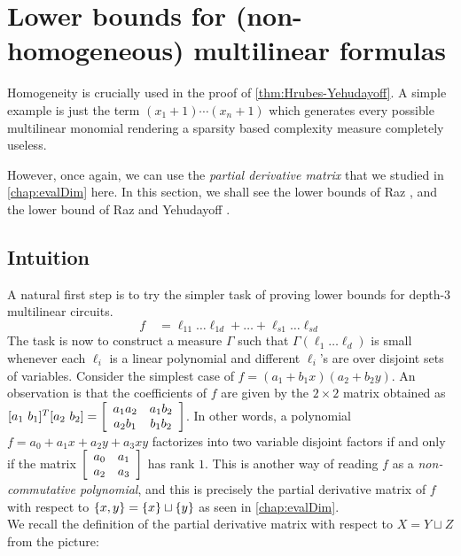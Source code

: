 \section{Lower bounds for (non-homogeneous)  multilinear formulas}

Homogeneity is crucially used in the proof of \autoref{thm:Hrubes-Yehudayoff}.
A simple example is just the term $(x_1 + 1) \cdots (x_n + 1)$ which generates every possible multilinear monomial rendering a sparsity based complexity measure completely useless.

However, once again, we can use the \emph{partial derivative matrix} that we studied in \autoref{chap:evalDim} here. In this section, we shall see the lower bounds of Raz \cite{raz2004}, and the lower bound of Raz and Yehudayoff \cite{raz-yehudayoff}. 

\subsection*{Intuition}

A natural first step is to try the simpler task of proving lower bounds for depth-$3$ multilinear circuits. 
$$
f \quad = \ell_{11} \dots \ell_{1d} + \dots + \ell_{s1}\dots \ell_{sd}
$$
The task is now to construct a measure $\Gamma$ such that $\Gamma(\ell_1\dots \ell_d)$ is small whenever each $\ell_i$ is a linear polynomial and different $\ell_i$'s are over disjoint sets of variables. 
Consider the simplest case of $f = (a_1  + b_1x)(a_2  + b_2y)$. 
An observation is that the coefficients of $f$ are given by the $2\times 2$ matrix obtained as $[a_1\ b_1]^T [a_2\ b_2] = \left[\begin{array}{cc} a_1a_2 & a_1b_2\\ a_2 b_1 & b_1 b_2\end{array}\right]$. 
In other words, a polynomial $f = a_0 + a_1x + a_2y + a_3xy$ factorizes into two variable disjoint factors if and only if the matrix $\left[\begin{array}{cc} a_0 & a_1\\ a_2 & a_3\end{array}\right]$ has rank $1$. 
This is another way of reading $f$ as a \emph{non-commutative polynomial}, and this is precisely the partial derivative matrix of $f$ with respect to $\left\{x,y\right\} = \left\{x\right\} \sqcup \left\{y\right\}$ as seen in \autoref{chap:evalDim}. 
\\

\noindent
We recall the definition of the partial derivative matrix with respect to $X = Y \sqcup Z$ from the picture:

